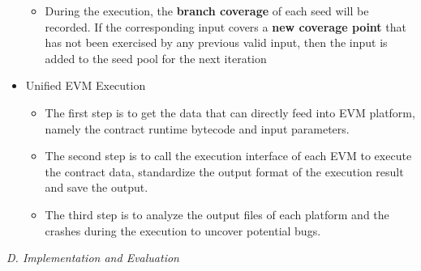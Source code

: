 \documentclass[a4paper]{article}
\begin{document}
\begin{itemize}
\begin{itemize}
			\item During the execution, the \textbf{branch coverage} of each seed will be recorded. If the corresponding input covers a \textbf{new coverage point} that has not been exercised by any previous valid input, then the input is added to the seed pool for the next iteration
		\end{itemize}       	
		\item Unified EVM Execution
		\begin{itemize}
			\item The first step is to get the data that can directly feed into EVM
			platform, namely the contract runtime bytecode and input parameters.
			\item The second step is to call the execution interface of each EVM to execute the
			contract data, standardize the output format of the execution result
			and save the output.
			\item The third step is to analyze the output files of each platform and the crashes during the execution to uncover potential bugs.
		\end{itemize}
	\end{itemize}
	\textit{D. Implementation and Evaluation} 
\end{document}
